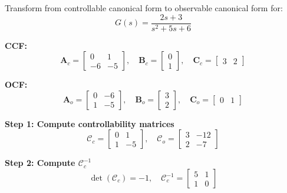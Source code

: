 \begin{example}
\label{ex:ccf_to_ocf}
Transform from controllable canonical form to observable canonical form for:
\begin{equation}
G(s) = \frac{2s + 3}{s^2 + 5s + 6}
\end{equation}

\textbf{CCF:}
\begin{equation}
\mathbf{A}_c = \begin{bmatrix} 0 & 1 \\ -6 & -5 \end{bmatrix}, \quad \mathbf{B}_c = \begin{bmatrix} 0 \\ 1 \end{bmatrix}, \quad \mathbf{C}_c = \begin{bmatrix} 3 & 2 \end{bmatrix}
\end{equation}

\textbf{OCF:}
\begin{equation}
\mathbf{A}_o = \begin{bmatrix} 0 & -6 \\ 1 & -5 \end{bmatrix}, \quad \mathbf{B}_o = \begin{bmatrix} 3 \\ 2 \end{bmatrix}, \quad \mathbf{C}_o = \begin{bmatrix} 0 & 1 \end{bmatrix}
\end{equation}

\textbf{Step 1: Compute controllability matrices}
\begin{equation}
\mathcal{C}_c = \begin{bmatrix} 0 & 1 \\ 1 & -5 \end{bmatrix}, \quad \mathcal{C}_o = \begin{bmatrix} 3 & -12 \\ 2 & -7 \end{bmatrix}
\end{equation}

\textbf{Step 2: Compute $\mathcal{C}_c^{-1}$}
\begin{equation}
\det(\mathcal{C}_c) = -1, \quad \mathcal{C}_c^{-1} = \begin{bmatrix} 5 & 1 \\ 1 & 0 \end{bmatrix}
\end{equation}


\end{example}
